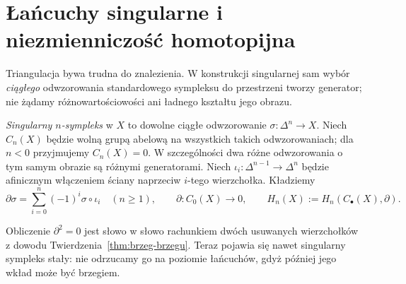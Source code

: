 \section{Łańcuchy singularne i niezmienniczość homotopijna}
\label{sec:homologia-singularna}

Triangulacja bywa trudna do znalezienia. W konstrukcji
singularnej sam wybór \emph{ciągłego} odwzorowania
standardowego sympleksu do przestrzeni tworzy
generator; nie żądamy różnowartościowości ani
ładnego kształtu jego obrazu.

\begin{definicja}
\label{def:homologia-singularna}
\emph{Singularny $n$-sympleks} w $X$ to dowolne
ciągłe odwzorowanie $\sigma:\Delta^n\to X$.
Niech $C_n(X)$ będzie wolną grupą abelową
na wszystkich takich odwzorowaniach; dla $n<0$ przyjmujemy $C_n(X)=0$.
W szczególności
dwa różne odwzorowania o tym samym obrazie są
różnymi generatorami. Niech
$\iota_i:\Delta^{n-1}\to\Delta^n$
będzie afinicznym włączeniem ściany
naprzeciw $i$-tego wierzchołka. Kładziemy
\begin{equation}\label{eq:singular-boundary}
 \partial\sigma=\sum_{i=0}^n(-1)^i
 \sigma\circ\iota_i\quad(n\geq1),
 \qquad \partial:C_0(X)\to0,
 \qquad H_n(X):=H_n(C_\bullet(X),\partial).
\end{equation}
\end{definicja}

Obliczenie $\partial^2=0$ jest słowo w słowo
rachunkiem dwóch usuwanych wierzchołków
z dowodu Twierdzenia~\ref{thm:brzeg-brzegu}.
Teraz pojawia się nawet singularny sympleks
stały: nie odrzucamy go na poziomie
łańcuchów, gdyż później jego wkład może
być brzegiem.

